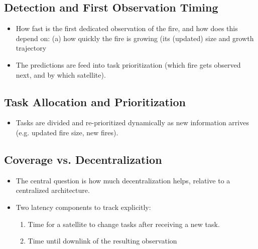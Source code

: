 \documentclass[11pt]{article}
\begin{document}
\subsection{Detection and First Observation Timing}
\begin{itemize}[leftmargin=1.2cm]
    \item How fast is the first dedicated observation of the fire, and how does this depend on: (a) how quickly the fire is growing (its (updated) size and growth trajectory
    \item The predictions are feed into task prioritization (which fire gets observed next, and by which satellite).
\end{itemize}

\subsection{Task Allocation and Prioritization}
\begin{itemize}[leftmargin=1.2cm]
    \item Tasks are divided and re-prioritized dynamically as new information arrives (e.g. updated fire size, new fires).
\end{itemize}

\subsection{Coverage vs. Decentralization}
\begin{itemize}[leftmargin=1.2cm]
    \item The central question is how much decentralization helps, relative to a centralized architecture.
    \item Two latency components to track explicitly:
    \begin{enumerate}
        \item Time for a satellite to change tasks after receiving a new task.
        \item Time until downlink of the resulting observation
    \end{enumerate}
\end{itemize}
\end{document}
